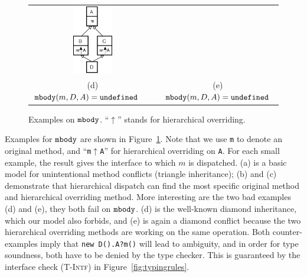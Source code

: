 \begin{figure}[t]
\begin{tabular}{cc}
		\includegraphics[height=3cm]{pics/P5.pdf}\hspace{4pt} \\ 
		(d) $\texttt{mbody}(m,D,A) = \texttt{undefined}$\ \ \  & (e) $\texttt{mbody}(m,D,A) = \texttt{undefined}$
	\end{tabular}
	\caption{Examples on $\texttt{mbody}$. ``$\uparrow$'' stands for hierarchical overriding.}\label{fig:examplesmbody}
\end{figure}

Examples for $\texttt{mbody}$ are shown in Figure~\ref{fig:examplesmbody}. Note that we use \lstinline|m| to denote an original method, and ``\lstinline|m|$\uparrow$\lstinline|A|'' for hierarchical overriding on \lstinline|A|. For each small example, the result
gives the interface to which $m$ is dispatched. (a) is a basic model for unintentional method conflicts (triangle inheritance); (b) and (c) demonstrate
that hierarchical dispatch can find the most specific original method and hierarchical overriding method. More interesting are the two bad examples
(d) and (e), they both fail on $\texttt{mbody}$. (d) is the well-known diamond inheritance, which our model also forbids, and (e) is again a diamond conflict because the two hierarchical overriding methods are working on the same operation. Both counter-examples imply that \lstinline|new D().A?m()| will
lead to ambiguity, and in order for type soundness, both have to be denied by the type checker. This is guaranteed by the interface check
\textsc{(T-Intf)} in Figure~\ref{fig:typingrules}.